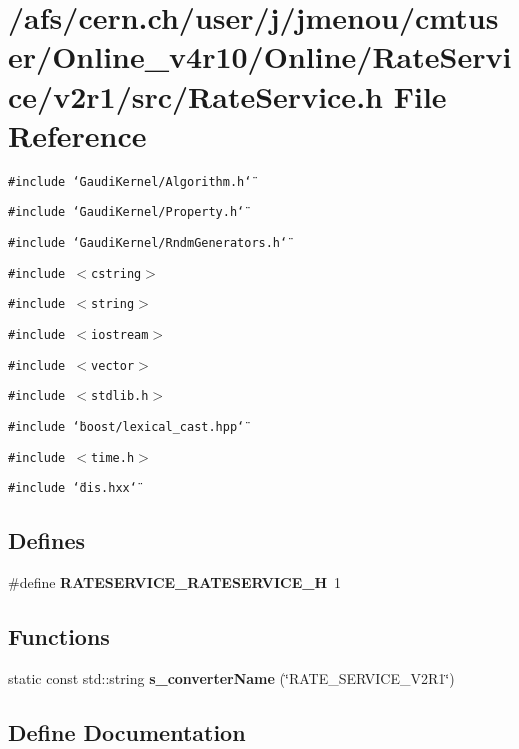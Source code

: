\section{/afs/cern.ch/user/j/jmenou/cmtuser/Online\_\-v4r10/Online/Rate\-Service/v2r1/src/Rate\-Service.h File Reference}
\label{RateService_8h}
{\tt \#include \char`\"{}Gaudi\-Kernel/Algorithm.h\char`\"{}}\par
{\tt \#include \char`\"{}Gaudi\-Kernel/Property.h\char`\"{}}\par
{\tt \#include \char`\"{}Gaudi\-Kernel/Rndm\-Generators.h\char`\"{}}\par
{\tt \#include $<$cstring$>$}\par
{\tt \#include $<$string$>$}\par
{\tt \#include $<$iostream$>$}\par
{\tt \#include $<$vector$>$}\par
{\tt \#include $<$stdlib.h$>$}\par
{\tt \#include \char`\"{}boost/lexical\_\-cast.hpp\char`\"{}}\par
{\tt \#include $<$time.h$>$}\par
{\tt \#include \char`\"{}dis.hxx\char`\"{}}\par
\subsection*{Defines}
\begin{CompactItemize}
\item 
\#define {\bf RATESERVICE\_\-RATESERVICE\_\-H}~1
\end{CompactItemize}
\subsection*{Functions}
\begin{CompactItemize}
\item 
static const std::string {\bf s\_\-converter\-Name} (\char`\"{}RATE\_\-SERVICE\_\-V2R1\char`\"{})
\end{CompactItemize}


\subsection{Define Documentation}
